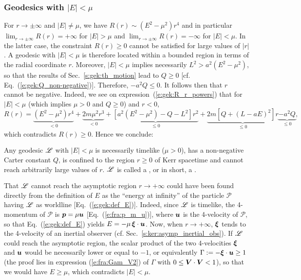 \subsubsection{Geodesics with $|E|<\mu$} \label{s:gek:bound_geod}

For $r\to \pm\infty$ and $|E|\neq \mu$,
we have $R(r) \sim (E^2 - \mu^2) r^4$ and in
particular $\lim_{r\to\pm\infty} R(r) = + \infty$ for $|E|>\mu$
and $\lim_{r\to\pm\infty} R(r) = - \infty$ for $|E|<\mu$. In the latter case,
the constraint $R(r) \geq 0$ cannot be satisfied for large values
of $|r|$. A geodesic with $|E|<\mu$ is therefore located within a bounded
region in terms of the radial coordinate $r$. Moreover, $|E|<\mu$
implies necessarily $L^2 > a^2 (E^2 - \mu^2)$, so that
the results of
Sec.~\ref{s:gek:th_motion} lead to $Q\geq 0$
[cf. Eq.~(\ref{e:gek:Q_non-negative})]. Therefore, $-a^2 Q \leq 0$.
It follows then that $r$ cannot be negative.
Indeed, we see
on expression~(\ref{e:gek:R_r_powers}) that for $|E|<\mu$ (which implies $\mu>0$ and $Q\geq 0$) and $r<0$,
\[
    R(r) = \underbrace{(E^2 - \mu^2) r^4}_{<0} + \underbrace{2 m \mu^2 r^3}_{<0}
     + \underbrace{\left[ a^2 (E^2 - \mu^2) - Q - L^2 \right] r^2}_{\leq 0}
     + \underbrace{2m\left[ Q + (L - a E)^2 \right] r}_{\leq 0}
     \underbrace{-a^2 Q}_{\leq 0} ,
\]
which contradicts $R(r)\geq 0$.
Hence we conclude:
\begin{prop}
\label{p:gek:bound_orbits}
Any geodesic $\mathscr{L}$ with $|E|<\mu$ is necessarily timelike ($\mu >0$),
has a non-negative Carter constant $Q$,
is confined to the region $r\geq 0$ of Kerr spacetime
and cannot reach arbitrarily large values of $r$. $\mathscr{L}$ is called a
,
or in short, a .
\end{prop}
\begin{remark} \label{r:gek:bound_geod}
That $\mathscr{L}$
cannot reach the asymptotic region $r\to +\infty$ could have been
found directly from the definition of $E$ as the ``energy at infinity''
of the particle $\mathscr{P}$ having $\mathscr{L}$ as worldline
[Eq.~(\ref{e:gek:def_E})]. Indeed, since $\mathscr{L}$ is timelike, the 4-momentum
of $\mathscr{P}$ is $\bm{p} = \mu \bm{u}$ [Eq.~(\ref{e:fra:p_m_u})], where
$\bm{u}$ is the 4-velocity of $\mathscr{P}$, so that Eq.~(\ref{e:gek:def_E})
yields $E = - \mu\, \bm{\xi}\cdot\bm{u}$. Now, when $r\to +\infty$, $\bm{\xi}$
tends to the 4-velocity of an inertial observer (cf. Sec.~\ref{s:ker:asymp_inertial_obs}).
If $\mathscr{L}$ could reach the asymptotic region,
the scalar
product of the two 4-velocities $\bm{\xi}$ and
$\bm{u}$ would be necessarily lower or equal to $-1$, or equivalently
$\Gamma := - \bm{\xi}\cdot\bm{u} \geq 1$ (the proof lies in expression
(\ref{e:fra:Gam_V2}) of $\Gamma$ with $0\leq \bm{V}\cdot\bm{V} < 1$), so that
we would have $E \geq \mu$, which contradicts $|E|<\mu$.
\end{remark}

